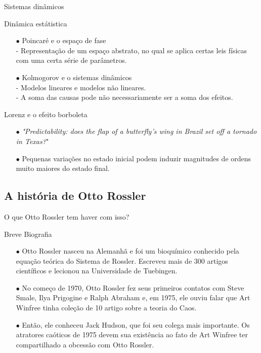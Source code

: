 \documentclass{beamer}
\begin{document}
\begin{frame}{Sistemas dinâmicos}
	\begin{exampleblock}{Dinâmica estátistica}
		\begin{itemize}
			\item [$\bullet$] Poincaré e o espaço de fase
				\\ - Representação de um espaço abstrato, no qual se aplica certas leis físicas com uma certa série de parâmetros.
			\item [$\bullet$] Kolmogorov e o sistemas dinâmicos
				\\ - Modelos lineares e modelos não lineares.
				\\ - A soma das causas pode não necessariamente ser a soma dos efeitos.
		\end{itemize}
	\end{exampleblock}
	
	\begin{exampleblock}{Lorenz e o efeito borboleta}
	\begin{itemize}
		\item [$\bullet$] \textit{"Predictability: does the flap of a butterfly's wing in Brazil set off a tornado in Texas?}"
		\item [$\bullet$] Pequenas variações no estado inicial podem induzir magnitudes de ordens muito maiores do estado final.
	\end{itemize}
	\end{exampleblock}
\end{frame}

	
\subsection{A história de Otto Rossler}
\begin{frame}{O que Otto Rossler tem haver com isso?}
	
	\begin{exampleblock}{Breve Biografia}
		\begin{itemize}
		\item [$\bullet$] Otto Rossler nasceu na Alemanhã e foi um bioquímico conhecido pela equação teórica do Sistema de Rossler. 
		Escreveu mais de 300 artigos científicos e lecionou na Universidade de Tuebingen.
		
		\item [$\bullet$] No começo de 1970, Otto Rossler fez seus primeiros contatos com Steve Smale, Ilya Prigogine e Ralph Abraham e, em 1975, ele ouviu falar que Art Winfree tinha coleção de 10 artigo sobre a teoria do Caos. 
		
		\item [$\bullet$] Então, ele conheceu Jack Hudson, que foi seu colega mais importante.
		Os atratores caóticos de 1975 devem sua existência ao fato de Art Winfree ter compartilhado a obcessão com Otto Rossler.
		\end{itemize}
	\end{exampleblock}
\end{frame}
\end{document}
